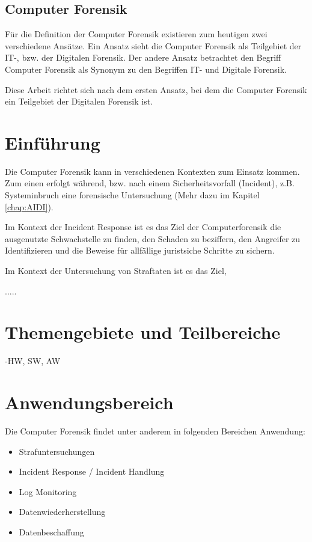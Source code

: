 \subsection{Computer Forensik}
Für die Definition der Computer Forensik existieren zum heutigen zwei verschiedene Ansätze. Ein Ansatz sieht die Computer Forensik als Teilgebiet der IT-, bzw. der Digitalen Forensik. Der andere Ansatz betrachtet den Begriff Computer Forensik als Synonym zu den Begriffen IT- und Digitale Forensik.

Diese Arbeit richtet sich nach dem ersten Ansatz, bei dem die Computer Forensik ein Teilgebiet der Digitalen Forensik ist.





\section{Einführung}
Die Computer Forensik kann in verschiedenen Kontexten zum Einsatz kommen. Zum einen erfolgt während, bzw. nach einem Sicherheitsvorfall (Incident), z.B. Systeminbruch eine forensische Untersuchung (Mehr dazu im Kapitel \ref{chap:AIDI}). 

Im Kontext der Incident Response ist es das Ziel der Computerforensik die ausgenutzte Schwachstelle zu finden, den Schaden zu beziffern, den Angreifer zu Identifizieren und die Beweise für allfällige juristsiche Schritte zu sichern.

Im Kontext der Untersuchung von Straftaten ist es das Ziel, 

.....

\section{Themengebiete und Teilbereiche}
-HW, SW, AW

\section{Anwendungsbereich}
Die Computer Forensik findet unter anderem in folgenden Bereichen Anwendung:

\begin{itemize}
\item Strafuntersuchungen
\item Incident Response / Incident Handlung
\item Log Monitoring
\item Datenwiederherstellung
\item Datenbeschaffung
\end{itemize}

